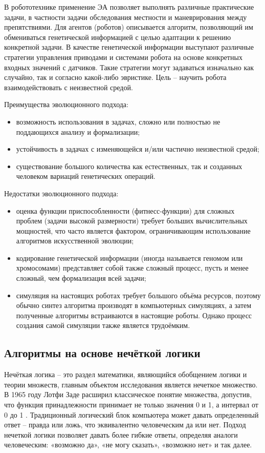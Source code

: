 В робототехнике применение ЭА позволяет выполнять различные практические задачи, в частности задачи обследования местности и маневрирования между препятствиями. 
Для агентов (роботов) описывается алгоритм, позволяющий им обмениваться генетической информацией с целью адаптации к решению конкретной задачи. 
В качестве генетической информации выступают различные стратегии управления приводами и системами робота на основе конкретных входных значений с датчиков. 
Такие стратегии могут задаваться изначально как случайно, так и согласно какой-либо эвристике. 
Цель – научить робота взаимодействовать с неизвестной средой. 

Преимущества эволюционного подхода:
\begin{itemize}
	\item возможность использования в задачах, сложно или полностью не поддающихся анализу и формализации;
	\item устойчивость в задачах с изменяющейся и/или частично неизвестной средой;
	\item существование большого количества как естественных, так и созданных человеком вариаций генетических операций.
\end{itemize}

Недостатки эволюционного подхода:
\begin{itemize}
	\item оценка функции приспособленности (фитнесс-функции) для сложных проблем (задачи высокой размерности) требует больших вычислительных мощностей, что часто является фактором, ограничивающим использование алгоритмов искусственной эволюции;
	\item кодирование генетической информации (иногда называется геномом или хромосомами) представляет собой также сложный процесс, пусть и менее сложный, чем формализация всей задачи;
	\item симуляция на настоящих роботах требует большого объёма ресурсов, поэтому обычно синтез алгоритма производят в компьютерных симуляциях, а затем полученные алгоритмы встраиваются в настоящие роботы. Однако процесс создания самой симуляции также является трудоёмким.
\end{itemize}


\subsection{Алгоритмы на основе нечёткой логики}

Нечёткая логика -- это раздел математики, являющийся обобщением логики и теории множеств, главным объектом исследования является нечеткое множество. 
В 1965 году Лотфи Заде расширил классическое понятие множества, допустив, что функция принадлежности принимает не только значения 0 и 1, а интервал от 0 до 1 \cite{fuzzy}. 
Традиционный логический блок компьютера может давать определенный ответ -- правда или ложь, что эквивалентно человеческим да или нет. 
Подход нечеткой логики позволяет давать более гибкие ответы, определяя аналоги человеческим: «возможно да», «не могу сказать», «возможно нет» и так далее. 

